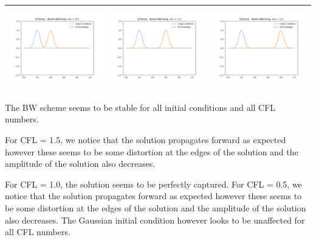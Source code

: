 \documentclass[a4paper,twoside,11pt]{article}
\begin{document}
\begin{table}[!h]
\begin{tabular}{ | c | m{5cm} | m{5cm} | }
            \begin{minipage}{.3\textwidth}
              \includegraphics[width=\linewidth, height=3.5cm]{../plots/scheme5-IC5-mu0_5.png}
            \end{minipage}
            &
            \begin{minipage}{.3\textwidth}
              \includegraphics[width=\linewidth, height=3.5cm]{../plots/scheme5-IC5-mu1_0.png}
            \end{minipage}
            &
            \begin{minipage}{.3\textwidth}
              \includegraphics[width=\linewidth, height=3.5cm]{../plots/scheme5-IC5-mu1_5.png}
            \end{minipage} \\
            \hline
          \end{tabular}
        \end{table}

        The BW scheme seems to be stable for all initial conditions and all CFL numbers.

        For CFL = 1.5, we notice that the solution propagates forward as expected however these seems to be some distortion at the edges of the solution and the amplitude of the solution also decreases.

        For CFL = 1.0, the solution seems to be perfectly captured. For CFL = 0.5, we notice that the solution propagates forward as expected however these seems to be some distortion at the edges of the solution and the amplitude of the solution also decreases. The Gaussian initial condition however looks to be unaffected for all CFL numbers.
\end{document}

